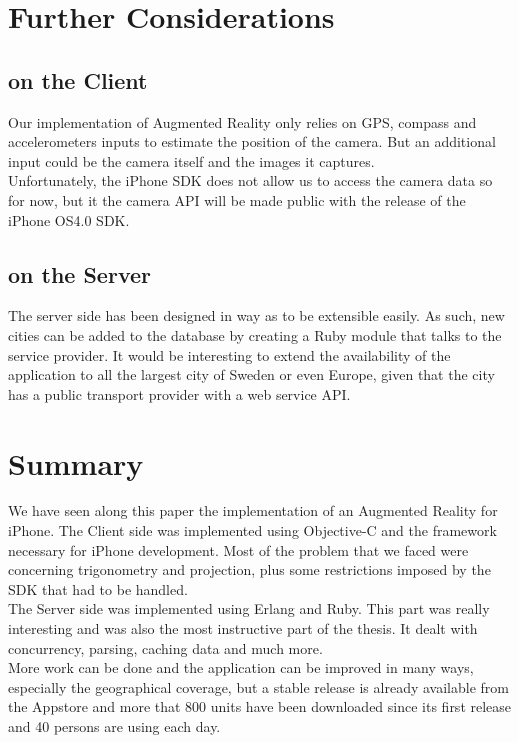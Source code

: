 \clearpage


\section{Further Considerations}
\subsection{on the Client}

Our implementation of Augmented Reality only relies on GPS, compass and accelerometers inputs to estimate the position of the camera. But an additional input could be the camera itself and the images it captures.\\

Unfortunately, the iPhone SDK does not allow us to access the camera data so for now, but it the camera API will be made public with the release of the iPhone OS4.0 SDK.

\subsection{on the Server}

The server side has been designed in way as to be extensible easily. As such, new cities can be added to the database by creating a Ruby module that talks to the service provider. It would be interesting to extend the availability of the application to all the largest city of Sweden or even Europe, given that the city has a public transport provider with a web service API.

\section{Summary}

We have seen along this paper the implementation of an Augmented Reality for iPhone. The Client side was implemented using Objective-C and the framework necessary for iPhone development. Most of the problem that we faced were concerning trigonometry and projection, plus some restrictions imposed by the SDK that had to be handled.\\

The Server side was implemented using Erlang and Ruby. This part was really interesting and was also the most instructive part of the thesis. It dealt with concurrency, parsing, caching data and much more.\\

More work can be done and the application can be improved in many ways, especially the geographical coverage, but a stable release is already available from the Appstore and more that 800 units have been downloaded since its first release and 40 persons are using each day.\\

